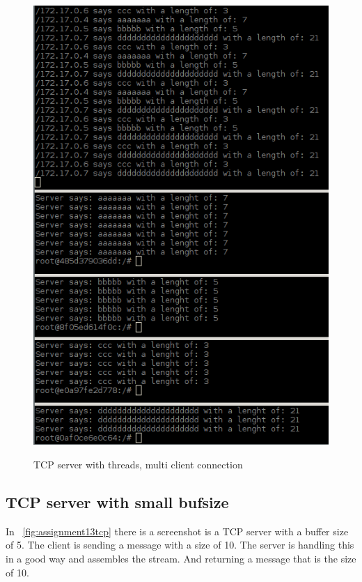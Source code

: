 \documentclass[a4paper,12pt]{article} %
\begin{document}
{\begin{figure}[H]
    \centering  
    \includegraphics[scale=0.7]{img/assignment13.png}
	\label{fig:assignment13}
	\caption{TCP server with threads, multi client connection}
\end{figure}

\clearpage

\subsection{TCP server with small bufsize}

In ~\ref{fig:assignment13tcp} there is a screenshot is a TCP server with a buffer size of 5.
The client is sending a message with a size of 10. The server is handling this in a good way and assembles the stream.
And returning a message that is the size of 10.

}
\end{document}

